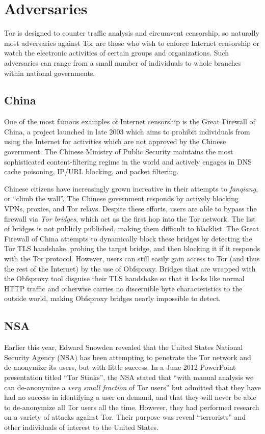 \documentclass[journal]{IEEEtran}
\begin{document}
\section{Adversaries}

Tor is designed to counter traffic analysis and circumvent censorship, so naturally most adversaries against Tor are those who wish to enforce Internet censorship or watch the electronic activities of certain groups and organizations. Such adversaries can range from a small number of individuals to whole branches within national governments.

\subsection{China}

One of the most famous examples of Internet censorship is the Great Firewall of China, a project launched in late 2003 which aims to prohibit individuals from using the Internet for activities which are not approved by the Chinese government. The Chinese Ministry of Public Security maintains the most sophisticated content-filtering regime in the world and actively engages in DNS cache poisoning, IP/URL blocking, and packet filtering.

Chinese citizens have increasingly grown increative in their attempts to \textit{fanqiang}, or ``climb the wall''. The Chinese government responds by actively blocking VPNs, proxies, and Tor relays. Despite these efforts, users are able to bypass the firewall via \textit{Tor bridges}, which act as the first hop into the Tor network. The list of bridges is not publicly published, making them difficult to blacklist. The Great Firewall of China attempts to dynamically block these bridges by detecting the Tor TLS handshake, probing the target bridge, and then blocking it if it responds with the Tor protocol. However, users can still easily gain access to Tor (and thus the rest of the Internet) by the use of Obfsproxy. Bridges that are wrapped with the Obfsproxy tool disguise their TLS handshake so that it looks like normal HTTP traffic and otherwise carries no discernible byte characteristics to the outside world, making Obfsproxy bridges nearly impossible to detect.\cite{Anderson2013}

\subsection{NSA}

Earlier this year, Edward Snowden revealed that the United States National Security Agency (NSA) has been attempting to penetrate the Tor network and de-anonymize its users, but with little success. In a June 2012 PowerPoint presentation titled ``Tor Stinks'', the NSA stated that ``with manual analysis we can de-anonymize a \textit{very small fraction} of Tor users'' but admitted that they have had no success in identifying a user on demand, and that they will never be able to de-anonymize all Tor users all the time. However, they had performed research on a variety of attacks against Tor. Their purpose was reveal ``terrorists'' and other individuals of interest to the United States.
\end{document}
